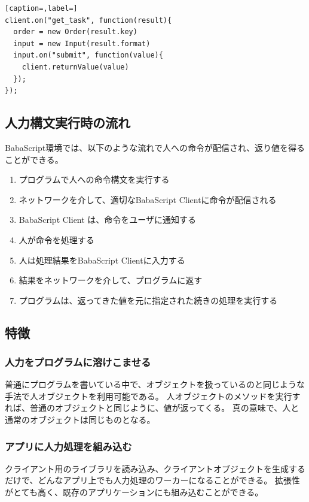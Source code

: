 \documentclass{deimj}
\begin{document}
\begin{lstlisting}[caption=,label=] 
client.on("get_task", function(result){
  order = new Order(result.key)
  input = new Input(result.format)
  input.on("submit", function(value){
    client.returnValue(value)
  });  
});
\end{lstlisting}

  
\subsection{人力構文実行時の流れ}
BabaScript環境では、以下のような流れで人への命令が配信され、返り値を得ることができる。

\begin{enumerate}
\item プログラムで人への命令構文を実行する
\item ネットワークを介して、適切なBabaScript Clientに命令が配信される
\item BabaScript Client は、命令をユーザに通知する
\item 人が命令を処理する
\item 人は処理結果をBabaScript Clientに入力する
\item 結果をネットワークを介して、プログラムに返す
\item プログラムは、返ってきた値を元に指定された続きの処理を実行する
\end{enumerate}

\subsection{特徴}
\subsubsection{人力をプログラムに溶けこませる}
普通にプログラムを書いている中で、オブジェクトを扱っているのと同じような手法で人オブジェクトを利用可能である。
人オブジェクトのメソッドを実行すれば、普通のオブジェクトと同じように、値が返ってくる。
真の意味で、人と通常のオブジェクトは同じものとなる。

\subsubsection{アプリに人力処理を組み込む}
クライアント用のライブラリを読み込み、クライアントオブジェクトを生成するだけで、どんなアプリ上でも人力処理のワーカーになることができる。
拡張性がとても高く、既存のアプリケーションにも組み込むことができる。
\end{document}
